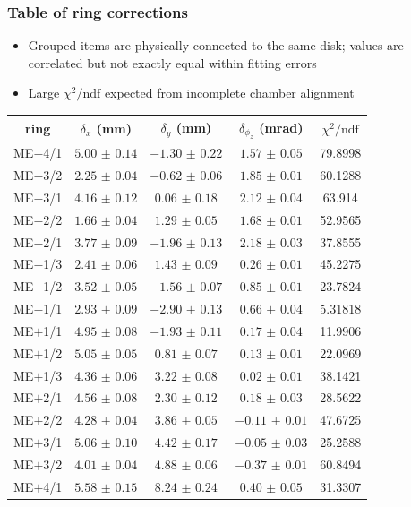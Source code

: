 \documentclass[compress]{beamer}
\begin{document}
\begin{frame}
\frametitle{Table of ring corrections}
\begin{itemize}
\item Grouped items are physically connected to the same disk; values are correlated but not exactly equal within fitting errors
\item Large $\chi^2/\mbox{ndf}$ expected from incomplete chamber alignment
\end{itemize}

\scriptsize
\renewcommand{\arraystretch}{1.1}
\begin{tabular}{c | c c c c}
ring & $\delta_x$ (mm) & $\delta_y$ (mm) & $\delta_{\phi_z}$ (mrad) & $\chi^2/\mbox{ndf}$ \\\hline
ME$-$4/1 & $ 5.00$ $\pm$ $ 0.14$ & $-1.30$ $\pm$ $ 0.22$ & $ 1.57$ $\pm$ $ 0.05$ & 79.8998 \\\hline
ME$-$3/2 & $ 2.25$ $\pm$ $ 0.04$ & $-0.62$ $\pm$ $ 0.06$ & $ 1.85$ $\pm$ $ 0.01$ & 60.1288 \\
ME$-$3/1 & $ 4.16$ $\pm$ $ 0.12$ & $ 0.06$ $\pm$ $ 0.18$ & $ 2.12$ $\pm$ $ 0.04$ & 63.914 \\
ME$-$2/2 & $ 1.66$ $\pm$ $ 0.04$ & $ 1.29$ $\pm$ $ 0.05$ & $ 1.68$ $\pm$ $ 0.01$ & 52.9565 \\
ME$-$2/1 & $ 3.77$ $\pm$ $ 0.09$ & $-1.96$ $\pm$ $ 0.13$ & $ 2.18$ $\pm$ $ 0.03$ & 37.8555 \\\hline
ME$-$1/3 & $ 2.41$ $\pm$ $ 0.06$ & $ 1.43$ $\pm$ $ 0.09$ & $ 0.26$ $\pm$ $ 0.01$ & 45.2275 \\
ME$-$1/2 & $ 3.52$ $\pm$ $ 0.05$ & $-1.56$ $\pm$ $ 0.07$ & $ 0.85$ $\pm$ $ 0.01$ & 23.7824 \\
ME$-$1/1 & $ 2.93$ $\pm$ $ 0.09$ & $-2.90$ $\pm$ $ 0.13$ & $ 0.66$ $\pm$ $ 0.04$ & 5.31818 \\\hline
ME$+$1/1 & $ 4.95$ $\pm$ $ 0.08$ & $-1.93$ $\pm$ $ 0.11$ & $ 0.17$ $\pm$ $ 0.04$ & 11.9906 \\
ME$+$1/2 & $ 5.05$ $\pm$ $ 0.05$ & $ 0.81$ $\pm$ $ 0.07$ & $ 0.13$ $\pm$ $ 0.01$ & 22.0969 \\
ME$+$1/3 & $ 4.36$ $\pm$ $ 0.06$ & $ 3.22$ $\pm$ $ 0.08$ & $ 0.02$ $\pm$ $ 0.01$ & 38.1421 \\\hline
ME$+$2/1 & $ 4.56$ $\pm$ $ 0.08$ & $ 2.30$ $\pm$ $ 0.12$ & $ 0.18$ $\pm$ $ 0.03$ & 28.5622 \\
ME$+$2/2 & $ 4.28$ $\pm$ $ 0.04$ & $ 3.86$ $\pm$ $ 0.05$ & $-0.11$ $\pm$ $ 0.01$ & 47.6725 \\
ME$+$3/1 & $ 5.06$ $\pm$ $ 0.10$ & $ 4.42$ $\pm$ $ 0.17$ & $-0.05$ $\pm$ $ 0.03$ & 25.2588 \\
ME$+$3/2 & $ 4.01$ $\pm$ $ 0.04$ & $ 4.88$ $\pm$ $ 0.06$ & $-0.37$ $\pm$ $ 0.01$ & 60.8494 \\\hline
ME$+$4/1 & $ 5.58$ $\pm$ $ 0.15$ & $ 8.24$ $\pm$ $ 0.24$ & $ 0.40$ $\pm$ $ 0.05$ & 31.3307 \\
\end{tabular}
\end{frame}
\end{document}
